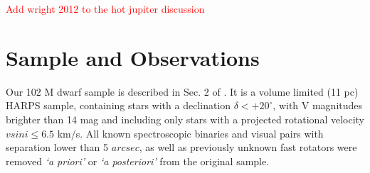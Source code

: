 \documentclass[structabstract]{aa}
\begin{document}
\textcolor{red}{Add wright 2012 to the hot jupiter discussion}

















%












\section{Sample and Observations}
\label{sample}

Our 102 M dwarf sample is described in Sec. 2 of \citet{Bonfils-2011}. It is a volume limited (11 pc) HARPS sample, containing stars with a declination $\delta< +20^{\circ}$, with V magnitudes brighter than 14  mag and including only stars with a projected rotational velocity $vsini\le 6.5$ km/s. All known spectroscopic binaries and visual pairs with separation lower than 5 $arcsec$, as well as previously unknown fast rotators were removed \textit{`a priori'} or \textit{`a posteriori'} from the original sample. 
\end{document}
